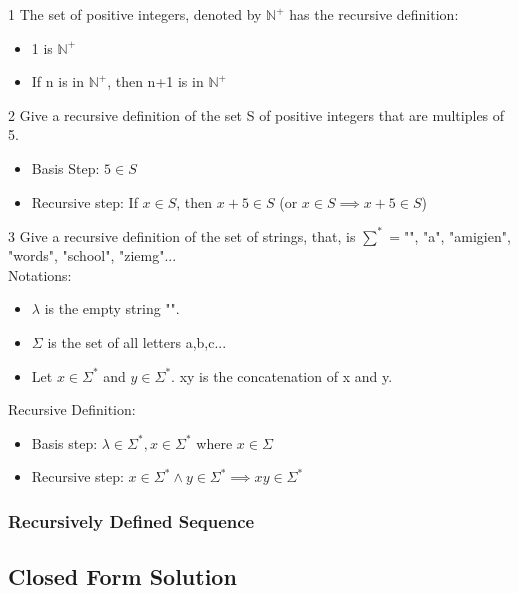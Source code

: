 \documentclass[12pt, letterpaper]{article}
\newcommand{\exheader}[1][ex]{{\tiny{#1}\normalsize}}
\begin{document}
\exheader[1] The set of positive integers, denoted by $\mathbb{N}^+$ has the recursive definition:
\begin{itemize}[leftmargin=*, label={}]
	\item 1 is $\mathbb{N}^+$
	\item If n is in $\mathbb{N}^+$, then n+1 is in $\mathbb{N}^+$
\end{itemize}

\bigbreak

\exheader[2] Give a recursive definition of the set S of positive integers that are multiples of 5.
\begin{itemize}[leftmargin=*, label={}]
	\item Basis Step: $5 \in S$
	\item Recursive step: If $x \in S$, then $x+5 \in S$ (or $x \in S \implies x + 5 \in S$)
\end{itemize}

\bigbreak

\exheader[3] Give a recursive definition of the set of strings, that, is $\sum^* = ${"", "a", "amigien", "words", "school", "ziemg"...} \\ 
Notations: 
\begin{itemize}[leftmargin=*, label={}]
	\item $\lambda$ is the empty string "".
	\item $\Sigma$ is the set of all letters {a,b,c...}
	\item Let $x \in \Sigma^*$ and $y \in \Sigma^*$. xy is the concatenation of x and y.
\end{itemize}
Recursive Definition:
\begin{itemize}[leftmargin=*, label={}]
	\item Basis step: $\lambda \in \Sigma^*, x \in \Sigma^*$ where $x \in \Sigma$
	\item Recursive step: $x \in \Sigma^* \land y \in \Sigma^* \implies xy \in \Sigma^*$
\end{itemize}
\bigbreak
{}

\pagebreak

\subsubsection*{Recursively Defined Sequence}

\subsection{Closed Form Solution}
\end{document}
